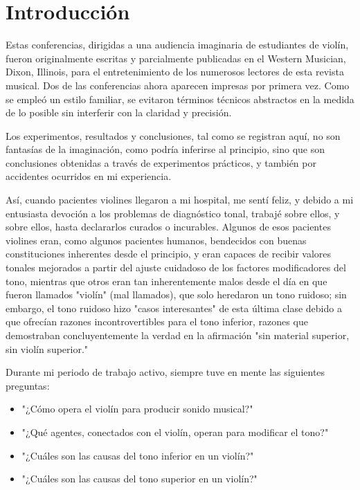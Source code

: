 \chapter*{Introducción}
Estas conferencias, dirigidas a una audiencia imaginaria de estudiantes de violín, fueron originalmente escritas y parcialmente publicadas en el Western Musician, Dixon, Illinois, para el entretenimiento de los numerosos lectores de esta revista musical. Dos de las conferencias ahora aparecen impresas por primera vez. Como se empleó un estilo familiar, se evitaron términos técnicos abstractos en la medida de lo posible sin interferir con la claridad y precisión.

Los experimentos, resultados y conclusiones, tal como se registran aquí, no son fantasías de la imaginación, como podría inferirse al principio, sino que son conclusiones obtenidas a través de experimentos prácticos, y también por accidentes ocurridos en mi experiencia.

Así, cuando pacientes violines llegaron a mi hospital, me sentí feliz, y debido a mi entusiasta devoción a los problemas de diagnóstico tonal, trabajé sobre ellos, y sobre ellos, hasta declararlos curados o incurables. Algunos de esos pacientes violines eran, como algunos pacientes humanos, bendecidos con buenas constituciones inherentes desde el principio, y eran capaces de recibir valores tonales mejorados a partir del ajuste cuidadoso de los factores modificadores del tono, mientras que otros eran tan inherentemente malos desde el día en que fueron llamados "violín" (mal llamados), que solo heredaron un tono ruidoso; sin embargo, el tono ruidoso hizo "casos interesantes" de esta última clase debido a que ofrecían razones incontrovertibles para el tono inferior, razones que demostraban concluyentemente la verdad en la afirmación "sin material superior, sin violín superior."

Durante mi periodo de trabajo activo, siempre tuve en mente las siguientes preguntas:
\begin{itemize}
    \item "¿Cómo opera el violín para producir sonido musical?"
    \item "¿Qué agentes, conectados con el violín, operan para modificar el tono?"
    \item "¿Cuáles son las causas del tono inferior en un violín?"
    \item "¿Cuáles son las causas del tono superior en un violín?"
\end{itemize}

